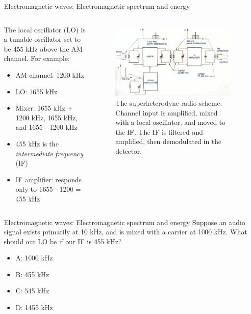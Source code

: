 \documentclass{beamer}
\begin{document}
\begin{frame}{Electromagnetic waves: Electromagnetic spectrum and energy}
\footnotesize
\begin{columns}[T]
\begin{column}{0.4\textwidth}
The local oscillator (LO) is a tunable oscillator set to be 455 kHz above the AM channel.  For example:
\begin{itemize}
\item AM channel: 1200 kHz
\item LO: 1655 kHz
\item Mixer: 1655 kHz + 1200 kHz, 1655 kHz, and 1655 - 1200 kHz
\item 455 kHz is the \textit{intermediate frequency} (IF)
\item IF amplifier: responds only to 1655 - 1200 = 455 kHz
\end{itemize}
\end{column}
\begin{column}{0.6\textwidth}
\begin{figure}
\centering
\includegraphics[width=\textwidth]{figures/SuperHet2.pdf}
\caption{\label{fig:amspec3} \footnotesize The superheterodyne radio scheme.  Channel input is amplified, mixed with a local oscillator, and moved to the IF.  The IF is filtered and amplified, then demodulated in the detector.}
\end{figure}
\end{column}
\end{columns}
\end{frame}

\begin{frame}{Electromagnetic waves: Electromagnetic spectrum and energy}
Suppose an audio signal exists primarily at 10 kHz, and is mixed with a carrier at 1000 kHz.  What should our LO be if our IF is 455 kHz?
\begin{itemize}
\item A: 1000 kHz
\item B: 455 kHz
\item C: 545 kHz
\item D: 1455 kHz
\end{itemize}
\end{frame}
\end{document}
